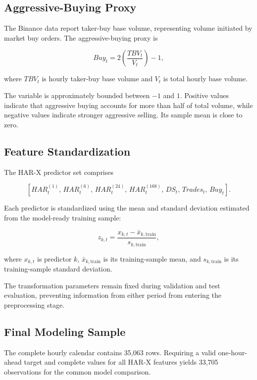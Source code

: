 \subsection{Aggressive-Buying Proxy}

The Binance data report taker-buy base volume, representing
volume initiated by market buy orders. The aggressive-buying
proxy is

\begin{equation}
Buy_t
=
2
\left(
\frac{TBV_t}{V_t}
\right)
-1,
\label{eq:buy-pressure}
\end{equation}

where \(TBV_t\) is hourly taker-buy base volume and \(V_t\) is
total hourly base volume.

The variable is approximately bounded between \(-1\) and
\(1\). Positive values indicate that aggressive buying
accounts for more than half of total volume, while negative
values indicate stronger aggressive selling. Its sample mean
is close to zero.

\subsection{Feature Standardization}

The HAR-X predictor set comprises

\[
\left[
HAR^{(1)}_t,\,
HAR^{(6)}_t,\,
HAR^{(24)}_t,\,
HAR^{(168)}_t,\,
DS_t,\,
Trades_t,\,
Buy_t
\right].
\]

Each predictor is standardized using the mean and standard
deviation estimated from the model-ready training sample:

\begin{equation}
z_{k,t}
=
\frac{x_{k,t}-\bar{x}_{k,\mathrm{train}}}
{s_{k,\mathrm{train}}},
\label{eq:standardization}
\end{equation}

where \(x_{k,t}\) is predictor \(k\),
\(\bar{x}_{k,\mathrm{train}}\) is its training-sample mean,
and \(s_{k,\mathrm{train}}\) is its training-sample standard
deviation.

The transformation parameters remain fixed during validation
and test evaluation, preventing information from either period
from entering the preprocessing stage.

\subsection{Final Modeling Sample}

The complete hourly calendar contains 35,063 rows. Requiring a
valid one-hour-ahead target and complete values for all HAR-X
features yields 33,705 observations for the common model
comparison.

